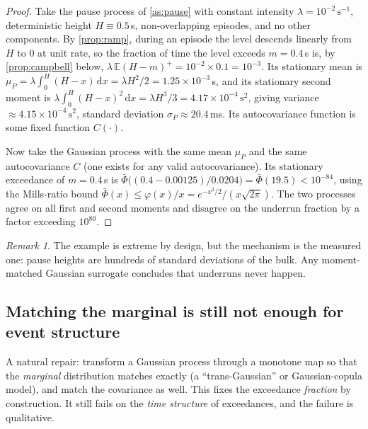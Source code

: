 \documentclass[11pt, a4paper]{article}
\theoremstyle{definition}
\theoremstyle{plain}
\theoremstyle{remark}
\newtheorem{remark}{Remark}[section]
\newcommand{\E}{\mathbb{E}}
\newcommand{\dd}{\,\mathrm{d}}
\newcommand{\pos}[1]{\left(#1\right)^{\!+}}
\begin{document}
\begin{proof}
Take the pause process of \cref{as:pause} with constant intensity
$\lambda = 10^{-2}\,\mathrm{s}^{-1}$, deterministic height
$H \equiv 0.5$\,s, non-overlapping episodes, and no other components.
By \cref{prop:ramp}, during an episode the level descends linearly from
$H$ to $0$ at unit rate, so the fraction of time the level exceeds
$m = 0.4$\,s is, by \cref{prop:campbell} below,
$\lambda\,\E\pos{H - m} = 10^{-2}\times 0.1 = 10^{-3}$.
Its stationary mean is
$\mu_P = \lambda \int_0^H (H-x)\dd x = \lambda H^2/2 = 1.25\times10^{-3}$\,s,
and its stationary second moment is
$\lambda\int_0^H (H-x)^2\dd x = \lambda H^3/3 = 4.17\times10^{-4}\,\mathrm{s}^2$,
giving variance $\approx 4.15\times10^{-4}\,\mathrm{s}^2$, standard
deviation $\sigma_P \approx 20.4$\,ms.  Its autocovariance function is
some fixed function $C(\cdot)$.

Now take the Gaussian process with the same mean $\mu_P$ and the same
autocovariance $C$ (one exists for any valid autocovariance).  Its
stationary exceedance of $m=0.4$\,s is
$\bar\Phi\bigl((0.4-0.00125)/0.0204\bigr) = \bar\Phi(19.5) < 10^{-84}$,
using the Mills-ratio bound
$\bar\Phi(x) \le \varphi(x)/x = e^{-x^2/2}/(x\sqrt{2\pi})$.  The two processes agree on all first
and second moments and disagree on the underrun fraction by a factor
exceeding $10^{80}$.
\end{proof}

\begin{remark}
The example is extreme by design, but the mechanism is the measured one:
pause heights are hundreds of standard deviations of the bulk.  Any
moment-matched Gaussian surrogate concludes that underruns never happen.
\end{remark}

\subsection{Matching the marginal is still not enough for event structure}
\label{sec:copula}

A natural repair: transform a Gaussian process through a monotone map so
that the \emph{marginal} distribution matches exactly (a
``trans-Gaussian'' or Gaussian-copula model), and match the covariance as
well.  This fixes the exceedance \emph{fraction} by construction.  It
still fails on the \emph{time structure} of exceedances, and the failure
is qualitative.
\end{document}
